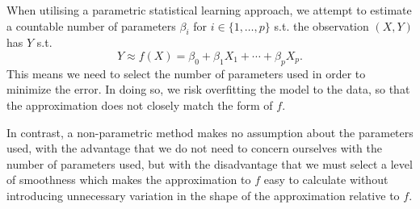 When utilising a parametric statistical learning approach, we attempt
to estimate
a countable number of parameters $\beta_i$ for $i \in \lbrace 1,
\dotsc, p \rbrace$
s.t. the observation $(X, Y)$ has $Y$ s.t.
\[
    Y \approx f(X) = \beta_0 + \beta_1 X_1 + \dotsb + \beta_p X_p.
\]
This means we need to select the number of parameters used in order to minimize
the error. In doing so, we risk overfitting the model to the data, so that the
approximation does not closely match the form of $f$.\par
\qquad In contrast, a non-parametric method makes no assumption about
the parameters
used, with the advantage that we do not need to concern ourselves
with the number of
parameters used, but with the disadvantage that we must select a level of
smoothness which makes the approximation to $f$ easy to calculate without
introducing unnecessary variation in the shape of the approximation
relative to $f$.
